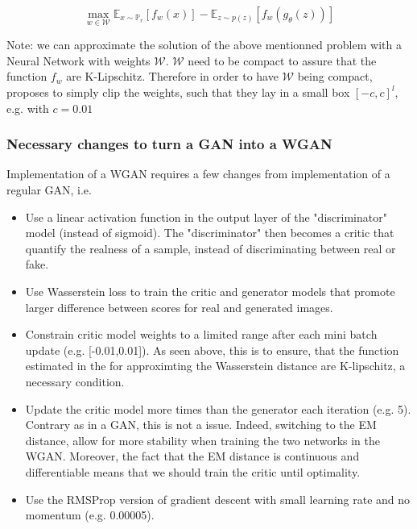 \documentclass{article}
\begin{document}
\begin{equation}
    \max_{w \in \mathcal{W}}  \mathbb{E}_{x \sim \mathbb{P}_r}[f_w(x)] - \mathbb{E}_{z \sim p(z)}[f_w(g_{\theta}(z))]
\end{equation}

Note: we can approximate the solution of the above mentionned problem with a Neural Network with weights $\mathcal{W}$. $\mathcal{W}$ need to be compact to assure that the function $f_w$ are K-Lipschitz. Therefore in order to have $\mathcal{W}$ being compact, \cite{arjovsky2017wasserstein} proposes to simply clip the weights, such that they lay in a small box $[-c, c]^l$, e.g. with $c = 0.01$


\subsubsection{Necessary changes to turn a GAN into a WGAN}

Implementation of a WGAN requires a few changes from implementation of a regular GAN, i.e. 

\begin{itemize}
    \item Use a linear activation function in the output layer of the "discriminator" model (instead of sigmoid). The "discriminator" then becomes a critic that quantify the realness of a sample, instead of discriminating between real or fake.
    \item Use Wasserstein loss to train the critic and generator models that promote larger difference between scores for real and generated images. 
    \item Constrain critic model weights to a limited range after each mini batch update (e.g. [-0.01,0.01]). As seen above, this is to ensure, that the function estimated in the for approximting the Wasserstein distance are K-lipschitz, a necessary condition.
    \item Update the critic model more times than the generator each iteration (e.g. 5). Contrary as in a GAN, this is not a issue. Indeed, switching to the EM distance, allow for more stability when training the two networks in the WGAN. Moreover, the fact that the EM distance is continuous and differentiable means that we should train the critic until optimality.
    \item Use the RMSProp version of gradient descent with small learning rate and no momentum (e.g. 0.00005).
    
\end{itemize}
\end{document}
